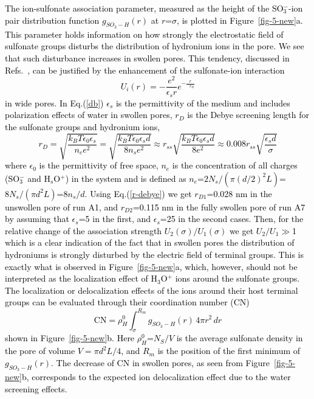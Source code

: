 \documentclass[3p,english,preprint]{elsarticle}
\newcommand{\need}[1]{\textcolor{black}{#1}}
\newcommand{\mage}[1]{\textcolor{black}{#1}}
\begin{document}
{\need{ 
The ion-sulfonate association parameter, measured as the height of  the SO$_3^-$-ion 
pair distribution function $g_{SO_3-H}(r)$ at $r$=$\sigma$, 
is plotted in  Figure~\ref{fig-5-new}a. This parameter holds 
information on  
how strongly the electrostatic field of  sulfonate groups  disturbs the distribution of hydronium ions in the pore. 
We see that such disturbance increases in swollen pores.   
This tendency, discussed in Refs.~\cite{eikerling-kornyshev-2001,eikerling-2001}, 
 can be justified  by the enhancement of the sulfonate-ion interaction 
\begin{equation}
U_i(r)= -\frac{e^2}{\epsilon_s r} e^{-\frac{r}{\, \, \,\, r_{D}}}
\label{db}
\end{equation}
in wide pores. 
In Eq.(\ref{db})  $\epsilon_s$ is the permittivity of the medium and includes  polarization effects of  water 
in  swollen pores, $r_{D}$ is the Debye screening length for the sulfonate groups  and hydronium ions,  
\begin{equation}
r_D=\sqrt{\frac{k_BT \epsilon_0 \epsilon_s}{ n_e e^2}}=
\sqrt{\frac{k_BT \epsilon_0\epsilon_s d}{8 n_s e^2}} \approx
r_{ss} \sqrt{\frac{k_BT \epsilon_0  \epsilon_s d}{ 8 e^2}} \approx
0.008 r_{ss} \sqrt{ \frac{\epsilon_s d}{\sigma}}
\label{r-debye}
\end{equation}
where $\epsilon_0$ is the permittivity of free space, $n_e$ is the concentration of all charges (SO$_3^-$ and H$_s$O$^+$) in the system 
and is defined as $n_e$=$2 N_s/(\pi (d/2)^2 L)$=$8 N_s/( \pi d^2 L)$=$8 n_s/d$. 
Using Eq.(\ref{r-debye})  we get 
$r_{D1}$=0.028 nm in  the unswollen     pore of run A1, and 
$r_{D2}$=0.115 nm in  the fully swollen pore of run A7 
by assuming that  $\epsilon_s$=5 in the first, and $\epsilon_s$=25 in the second cases.   
Then, for the relative change of the association strength $U_2(\sigma)/U_1(\sigma)$  we get $U_2/U_1$$\gg$1
which is a clear indication of the fact that 
in swollen pores the distribution of hydroniums is strongly disturbed by the electric field of terminal groups. 
This is exactly what is observed in Figure~\ref{fig-5-new}a, which, however, should not be interpreted as the  
localization effect of H$_3$O$^+$ ions around the sulfonate groups. \\
The localization or delocalization effects of the
ions around their host terminal groups can be evaluated through their  coordination number (CN) 
\begin{equation}
{\mbox{CN}}= \rho_H^0 \int_{\sigma}^{R_m} g_{SO_3-H}(r) \, 4 \pi r^2 \, dr
\label{CN}
\end{equation}
shown in Figure~\ref{fig-5-new}b. Here  
 $\rho_H^0$=$N_S/V$ is the average sulfonate density in the pore of volume  $V=\pi d^2 L/4$, 
and $R_m$ is the position of the first minimum of $g_{SO_3-H}(r)$. The decrease of CN
  in swollen pores, as seen from Figure~\ref{fig-5-new}b,  corresponds to 
the expected ion delocalization effect due to the water screening effects.
}}
\end{document}
